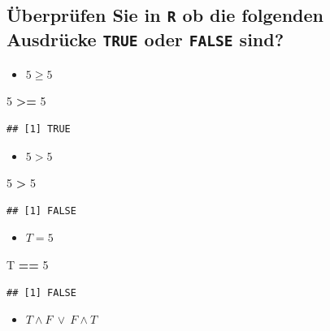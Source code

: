 \documentclass[12pt,a4paper]{article}
\newenvironment{Shaded}{\begin{snugshade}}{\end{snugshade}}
\newcommand{\DecValTok}[1]{\textcolor[rgb]{0.00,0.00,0.81}{#1}}
\newcommand{\NormalTok}[1]{#1}
\newcommand{\SpecialCharTok}[1]{\textcolor[rgb]{0.81,0.36,0.00}{\textbf{#1}}}
\begin{document}
\subsection{\texorpdfstring{Überprüfen Sie in \texttt{R} ob die
folgenden Ausdrücke \texttt{TRUE} oder \texttt{FALSE}
sind?}{Überprüfen Sie in R ob die folgenden Ausdrücke TRUE oder FALSE sind?}}\label{uxfcberpruxfcfen-sie-in-r-ob-die-folgenden-ausdruxfccke-true-oder-false-sind}

\begin{itemize}
  \item $5 \geq 5$
\end{itemize}

\begin{Shaded}
\begin{Highlighting}[]
    \DecValTok{5} \SpecialCharTok{\textgreater{}=} \DecValTok{5}
\end{Highlighting}
\end{Shaded}

\begin{verbatim}
## [1] TRUE
\end{verbatim}

\begin{itemize}
  \item $5 > 5$
\end{itemize}

\begin{Shaded}
\begin{Highlighting}[]
    \DecValTok{5} \SpecialCharTok{\textgreater{}} \DecValTok{5}
\end{Highlighting}
\end{Shaded}

\begin{verbatim}
## [1] FALSE
\end{verbatim}

\begin{itemize}
  \item $T = 5$
\end{itemize}

\begin{Shaded}
\begin{Highlighting}[]
\NormalTok{    T }\SpecialCharTok{==} \DecValTok{5}
\end{Highlighting}
\end{Shaded}

\begin{verbatim}
## [1] FALSE
\end{verbatim}

\begin{itemize}
  \item $T \land F \ \lor \ F \land T$
\end{itemize}
\end{document}
